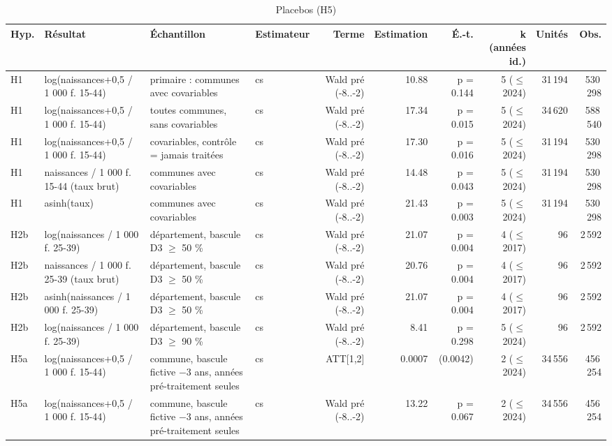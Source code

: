 \begin{table}\centering
\begin{threeparttable}
\caption{Placebos (H5)}\label{tab:placebo}
\scriptsize
\begin{tabular}{lp{4.1cm}p{7.2cm}lrrrrrr}
\toprule
Hyp. & Résultat & Échantillon & Estimateur & Terme & Estimation & É.-t. & k (années id.) & Unités & Obs. \\
\midrule
H1 & log(naissances+0,5 / 1 000 f. 15-44) & primaire : communes avec covariables & cs & Wald pré (-8..-2) & 10.88 & p = 0.144 & 5 ($\leq$ 2024) & 31\,194 & 530\,298 \\
H1 & log(naissances+0,5 / 1 000 f. 15-44) & toutes communes, sans covariables & cs & Wald pré (-8..-2) & 17.34 & p = 0.015 & 5 ($\leq$ 2024) & 34\,620 & 588\,540 \\
H1 & log(naissances+0,5 / 1 000 f. 15-44) & covariables, contrôle = jamais traitées & cs & Wald pré (-8..-2) & 17.30 & p = 0.016 & 5 ($\leq$ 2024) & 31\,194 & 530\,298 \\
H1 & naissances / 1 000 f. 15-44 (taux brut) & communes avec covariables & cs & Wald pré (-8..-2) & 14.48 & p = 0.043 & 5 ($\leq$ 2024) & 31\,194 & 530\,298 \\
H1 & asinh(taux) & communes avec covariables & cs & Wald pré (-8..-2) & 21.43 & p = 0.003 & 5 ($\leq$ 2024) & 31\,194 & 530\,298 \\
H2b & log(naissances / 1 000 f. 25-39) & département, bascule D3 $\geq$ 50 \% & cs & Wald pré (-8..-2) & 21.07 & p = 0.004 & 4 ($\leq$ 2017) & 96 & 2\,592 \\
H2b & naissances / 1 000 f. 25-39 (taux brut) & département, bascule D3 $\geq$ 50 \% & cs & Wald pré (-8..-2) & 20.76 & p = 0.004 & 4 ($\leq$ 2017) & 96 & 2\,592 \\
H2b & asinh(naissances / 1 000 f. 25-39) & département, bascule D3 $\geq$ 50 \% & cs & Wald pré (-8..-2) & 21.07 & p = 0.004 & 4 ($\leq$ 2017) & 96 & 2\,592 \\
H2b & log(naissances / 1 000 f. 25-39) & département, bascule D3 $\geq$ 90 \% & cs & Wald pré (-8..-2) & 8.41 & p = 0.298 & 5 ($\leq$ 2024) & 96 & 2\,592 \\
H5a & log(naissances+0,5 / 1 000 f. 15-44) & commune, bascule fictive $-$3 ans, années pré-traitement seules & cs & ATT[1,2] & 0.0007 & (0.0042) & 2 ($\leq$ 2024) & 34\,556 & 456\,254 \\
H5a & log(naissances+0,5 / 1 000 f. 15-44) & commune, bascule fictive $-$3 ans, années pré-traitement seules & cs & Wald pré (-8..-2) & 13.22 & p = 0.067 & 2 ($\leq$ 2024) & 34\,556 & 456\,254 \\

\end{tabular}
\end{threeparttable}
\end{table}
